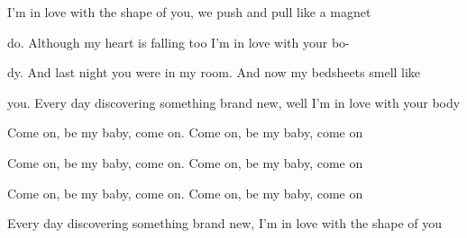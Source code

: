 \begin{song}
\bigskip

 I'm in love with the shape of you, we push and pull like a magnet \par
{}do. Although my heart is falling too I'm in love with your bo- \par
{}dy. And last night you were in my room. And now my bedsheets smell like \par
{}you. Every day discovering something brand new, well I'm in love with your body \par
{} Come on, be my baby, come on.  Come on, be my baby, come on \par
{} Come on, be my baby, come on.  Come on, be my baby, come on \par
{} Come on, be my baby, come on.  Come on, be my baby, come on \par
{} Every day discovering something brand new, I'm in love with the shape of you \par

\vfill

\end{song}
